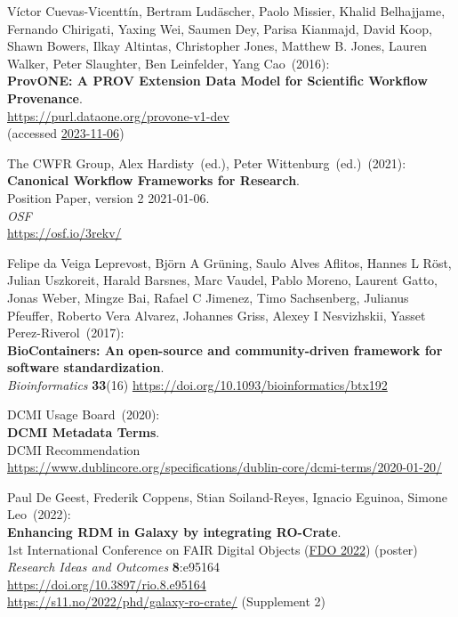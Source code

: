 \begin{thebibliography}{9}
Víctor Cuevas-Vicenttín, Bertram Ludäscher, Paolo Missier, Khalid Belhajjame, Fernando Chirigati, Yaxing Wei, Saumen Dey, Parisa Kianmajd, David Koop, Shawn Bowers, Ilkay Altintas, Christopher Jones, Matthew B. Jones, Lauren Walker, Peter Slaughter, Ben Leinfelder, Yang Cao~(2016): \\
\textbf{ProvONE: A PROV Extension Data Model for Scientific Workflow Provenance}.\\
\url{https://purl.dataone.org/provone-v1-dev}\\
(accessed \href{https://web.archive.org/web/20231106005203/http://jenkins-1.dataone.org/jenkins/view/Documentation%20Projects/job/ProvONE-Documentation-trunk/ws/provenance/ProvONE/v1/provone.html}{2023-11-06})

The CWFR Group, Alex Hardisty~(ed.), Peter Wittenburg~(ed.)~(2021): \\
\textbf{Canonical Workflow Frameworks for Research}.\\
Position Paper, version 2 2021-01-06. \\
\emph{OSF} \\
\url{https://osf.io/3rekv/}

Felipe da Veiga Leprevost, Björn A Grüning, Saulo Alves Aflitos, Hannes L Röst, Julian Uszkoreit, Harald Barsnes, Marc Vaudel, Pablo Moreno, Laurent Gatto, Jonas Weber, Mingze Bai, Rafael C Jimenez, Timo Sachsenberg, Julianus Pfeuffer, Roberto Vera Alvarez, Johannes Griss, Alexey I Nesvizhskii, Yasset Perez-Riverol~(2017): \\
\textbf{BioContainers: An open-source and community-driven framework for software standardization}.\\
\emph{Bioinformatics} \textbf{33}(16) 
\url{https://doi.org/10.1093/bioinformatics/btx192}

DCMI Usage Board~(2020): \\
\textbf{DCMI Metadata Terms}. \\
DCMI Recommendation\\
\url{https://www.dublincore.org/specifications/dublin-core/dcmi-terms/2020-01-20/}

Paul De Geest, Frederik Coppens, Stian
Soiland-Reyes, Ignacio Eguinoa, Simone Leo~(2022): \\
\textbf{Enhancing RDM in Galaxy by integrating RO-Crate}.\\
1st International Conference on FAIR Digital Objects
(\href{https://www.fdo2022.org/}{FDO 2022}) (poster)\\
\emph{Research Ideas and Outcomes} \textbf{8}:e95164\\
\url{https://doi.org/10.3897/rio.8.e95164}\\
\url{https://s11.no/2022/phd/galaxy-ro-crate/} (Supplement 2)


\end{thebibliography}
